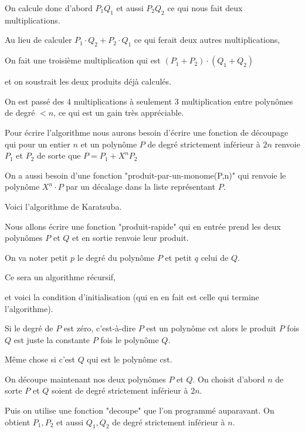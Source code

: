 \change

On calcule donc d'abord $P_1Q_1$ et aussi $P_2Q_2$ ce qui nous fait deux multiplications.

Au lieu de calculer $P_1 \cdot Q_2 + P_2 \cdot Q_1$ ce qui ferait deux autres multiplications,

On fait une troisième multiplication qui est $(P_1 + P_2 ) \cdot (Q_1 + Q_2 )$

et on soustrait les deux produits déjà calculés.



On est passé des $4$ multiplications à seulement $3$ multiplication entre polynômes de degré $<n$, 
ce qui est un gain très appréciable.

\change

Pour écrire l'algorithme nous aurons besoin d'écrire une fonction de découpage
qui pour un entier $n$ et un polynôme $P$ de degré strictement inférieur à $2n$ 
renvoie $P_1$ et $P_2$ de sorte que $P = P_1 + X^n P_2 $

\change
  
   On a aussi besoin d'une fonction "produit-par-un-monome(P,n)" qui renvoie
 le polynôme $X^n \cdot P$ par un décalage dans la liste représentant $P$.


\diapo

Voici l'algorithme de Karatsuba.

Nous allons écrire une fonction "produit-rapide"
qui en entrée prend les deux polynômes $P$ et $Q$ et 
en sortie renvoie leur produit.

On va noter petit $p$ le degré du polynôme  $P$ et petit $q$ celui de $Q$.

\change

Ce sera un algorithme récursif,

et voici la condition d'initialisation (qui en en fait est celle qui termine l'algorithme).

Si le degré de $P$ est zéro, c'est-à-dire $P$ est un polynôme cst
alors le produit $P$ fois $Q$ est juste la constante $P$ fois le polynôme $Q$.

Même chose si c'est $Q$ qui est le polynôme cst.


\change

On découpe maintenant nos deux polynômes $P$ et $Q$. On choisit d'abord $n$ de sorte 
$P$ et $Q$ soient de degré strictement inférieur à $2n$.

Puis on utilise une fonction "decoupe" que l'on programmé auparavant. 
On obtient $P_1, P_2$ et aussi $Q_1,Q_2$ de degré strictement inférieur à $n$.

